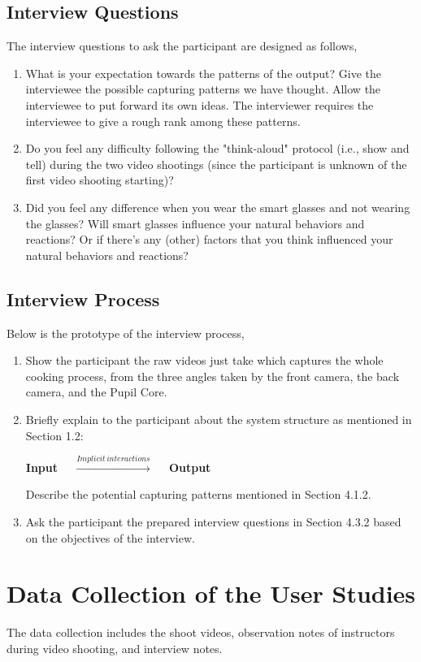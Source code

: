 \documentclass[fyp]{socreport}
\begin{document}
\subsection{Interview Questions}
The interview questions to ask the participant are designed as follows,
\begin{enumerate}
    \item What is your expectation towards the patterns of the output? Give the interviewee the possible capturing patterns we have thought. Allow the interviewee to put forward its own ideas. The interviewer requires the interviewee to give a rough rank among these patterns.
    \item Do you feel any difficulty following the "think-aloud" protocol (i.e., show and tell) during the two video shootings (since the participant is unknown of the first video shooting starting)?
    \item Did you feel any difference when you wear the smart glasses and not wearing the glasses? Will smart glasses influence your natural behaviors and reactions? Or if there's any (other) factors that you think influenced your natural behaviors and reactions?
\end{enumerate}

\subsection{Interview Process}
Below is the prototype of the interview process,
\begin{enumerate}
    \item Show the participant the raw videos just take which captures the whole cooking process, from the three angles taken by the front camera, the back camera, and the Pupil Core.
    \item Briefly explain to the participant about the system structure as mentioned in Section 1.2:
    \begin{center}
        \textbf{Input $\quad\stackrel{Implicit\,interactions}{\longrightarrow}\quad$ Output}
    \end{center}
    Describe the potential capturing patterns mentioned in Section 4.1.2.
    \item Ask the participant the prepared interview questions in Section 4.3.2 based on the objectives of the interview. 
\end{enumerate}

\section{Data Collection of the User Studies}
The data collection includes the shoot videos, observation notes of instructors during video shooting, and interview notes.
\end{document}
